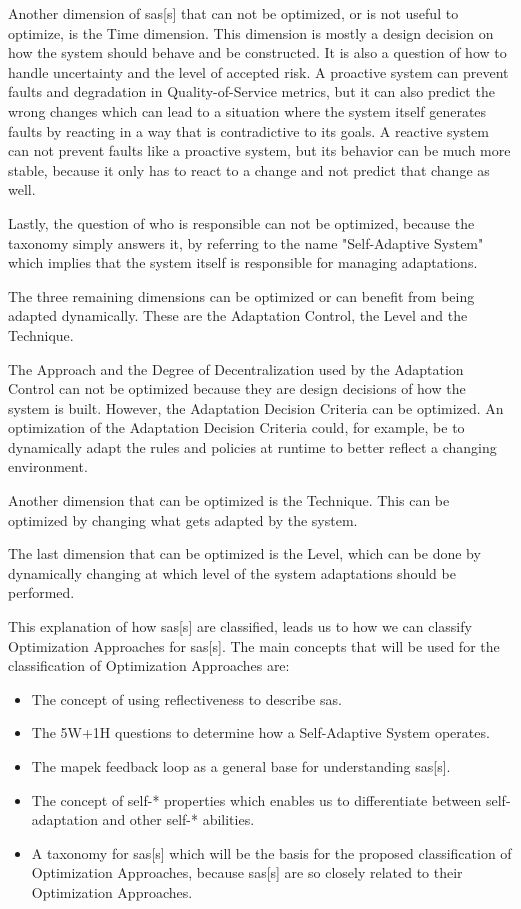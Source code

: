 \noindent Another dimension of \acrlong{sas}[s] that can not be optimized, or is not useful to optimize,
is the Time dimension. This dimension is mostly a design decision on how the system should behave and be constructed.
It is also a question of how to handle uncertainty and the level of accepted risk.
A proactive system can prevent faults and degradation in Quality-of-Service metrics,
but it can also predict the wrong changes which can lead to a situation where the system itself generates faults by
reacting in a way that is contradictive to its goals.
A reactive system can not prevent faults like a proactive system,
but its behavior can be much more stable, because it only has to react to a change and not predict that change as well.

\noindent Lastly, the question of who is responsible can not be optimized, because the taxonomy simply answers it,
by referring to the name "Self-Adaptive System" which implies that the system itself is responsible for managing adaptations.

\noindent The three remaining dimensions can be optimized or can benefit from being adapted dynamically.
These are the Adaptation Control, the Level and the Technique.

\noindent The Approach and the Degree of Decentralization used by the Adaptation Control can not be optimized 
because they are design decisions of how the system is built.
However, the Adaptation Decision Criteria can be optimized. An optimization of the Adaptation Decision Criteria
could, for example, be to dynamically adapt the rules and policies at runtime to better reflect a changing environment.

\noindent Another dimension that can be optimized is the Technique. 
This can be optimized by changing what gets adapted by the system.

\noindent The last dimension that can be optimized is the Level, which can be done by dynamically changing at which level of the system
adaptations should be performed.

\noindent This explanation of how \acrlong{sas}[s] are classified,
leads us to how we can classify Optimization Approaches for \acrlong{sas}[s].
The main concepts that will be used for the classification of Optimization Approaches are:
\begin{itemize}[nosep]
    \item The concept of using reflectiveness to describe \acrshort{sas}.
    \item The 5W+1H questions to determine how a Self-Adaptive System operates.
    \item The \acrshort{mapek} feedback loop as a general base for understanding \acrlong{sas}[s].
    \item The concept of self-* properties which enables us to differentiate between self-adaptation
    and other self-* abilities.
    \item A taxonomy for \acrlong{sas}[s] which will be the basis for the proposed classification of Optimization Approaches,
    because \acrlong{sas}[s] are so closely related to their Optimization Approaches.
\end{itemize}